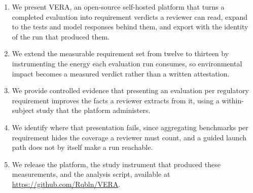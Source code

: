 \documentclass[10pt,conference]{IEEEtran}
\providecommand{\repourl}{https://github.com/Rqbln/VERA}
\providecommand{\todo}[1]{\textcolor{red}{[TODO: #1]}}
\begin{document}
\begin{enumerate}
   \item We present VERA, an open-source self-hosted platform that turns a completed evaluation into requirement verdicts a reviewer can read, expand to the tests and model responses behind them, and export with the identity of the run that produced them.
  \item We extend the measurable requirement set from twelve to thirteen by instrumenting the energy each evaluation run consumes, so environmental impact becomes a measured verdict rather than a written attestation.
  \item We provide controlled evidence that presenting an evaluation per regulatory requirement improves the facts a reviewer extracts from it, using a within-subject study that the platform administers.
  \item We identify where that presentation fails, since aggregating benchmarks per requirement hides the coverage a reviewer must count, and a guided launch path does not by itself make a run reachable.
  \item We release the platform, the study instrument that produced these measurements, and the analysis script, available at \url{\repourl}.
\end{enumerate}




\newsavebox\bibbox
\savebox\bibbox{\vbox{\footnotesize}}
\end{document}
